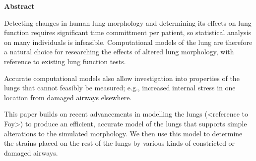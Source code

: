 %

{\Large \textbf{Abstract}}

\vspace{0.5cm}

Detecting changes in human lung morphology and determining its effects on lung function requires
significant time committment per patient, so statistical analysis on many individuals is infeasible.
Computational models of the lung are therefore a natural choice for researching the effects of
altered lung morphology, with reference to existing lung function tests.

Accurate computational models also allow investigation into properties of the lungs that cannot
feasibly be measured; e.g., increased internal stress in one location from damaged airways
elsewhere.

This paper builds on recent advancements in modelling the lungs (<reference to Foy>) to produce an
efficient, accurate model of the lungs that supports simple alterations to the simulated morphology.
We then use this model to determine the strains placed on the rest of the lungs by various kinds of
constricted or damaged airways.
